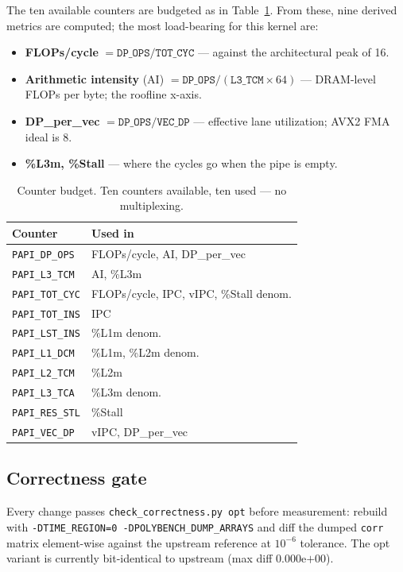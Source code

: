 \documentclass[11pt]{article}
\begin{document}
The ten available counters are budgeted as in Table~\ref{tab:counters}. From these, nine derived metrics are computed; the most load-bearing for this kernel are:

\begin{itemize}
\setlength\itemsep{0pt}
  \item \textbf{FLOPs/cycle} $= \texttt{DP\_OPS}/\texttt{TOT\_CYC}$ --- against the architectural peak of 16.
  \item \textbf{Arithmetic intensity} (AI) $= \texttt{DP\_OPS}/(\texttt{L3\_TCM} \times 64)$ --- DRAM-level FLOPs per byte; the roofline x-axis.
  \item \textbf{DP\_per\_vec} $= \texttt{DP\_OPS}/\texttt{VEC\_DP}$ --- effective lane utilization; AVX2 FMA ideal is 8.
  \item \textbf{\%L3m, \%Stall} --- where the cycles go when the pipe is empty.
\end{itemize}

\begin{table}[htp]
\centering
\small
\begin{tabular}{l l}
\toprule
Counter & Used in \\
\midrule
\texttt{PAPI\_DP\_OPS}    & FLOPs/cycle, AI, DP\_per\_vec \\
\texttt{PAPI\_L3\_TCM}    & AI, \%L3m \\
\texttt{PAPI\_TOT\_CYC}   & FLOPs/cycle, IPC, vIPC, \%Stall denom. \\
\texttt{PAPI\_TOT\_INS}   & IPC \\
\texttt{PAPI\_LST\_INS}   & \%L1m denom. \\
\texttt{PAPI\_L1\_DCM}    & \%L1m, \%L2m denom. \\
\texttt{PAPI\_L2\_TCM}    & \%L2m \\
\texttt{PAPI\_L3\_TCA}    & \%L3m denom. \\
\texttt{PAPI\_RES\_STL}   & \%Stall \\
\texttt{PAPI\_VEC\_DP}    & vIPC, DP\_per\_vec \\
\bottomrule
\end{tabular}
\caption{Counter budget. Ten counters available, ten used --- no multiplexing.}
\label{tab:counters}
\end{table}

\subsection{Correctness gate}

Every change passes \texttt{check\_correctness.py opt} before measurement: rebuild with \texttt{-DTIME\_REGION=0 -DPOLYBENCH\_DUMP\_ARRAYS} and diff the dumped \texttt{corr} matrix element-wise against the upstream reference at $10^{-6}$ tolerance. The opt variant is currently bit-identical to upstream (max diff $0.000$e$+00$).
\end{document}
